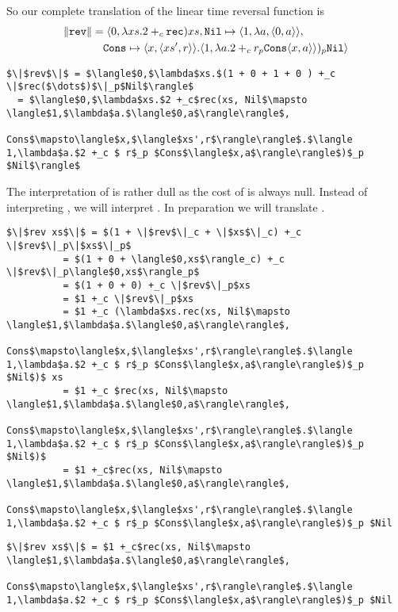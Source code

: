 So our complete translation of the linear time reversal function is
\begin{align*}
  \|\texttt{rev}\| &= \langle 0, \lambda xs.2 +_c \texttt{rec})xs, \texttt{Nil}\mapsto \langle 1, \lambda a, \langle 0, a \rangle\rangle,\\
              &\quad \texttt{Cons}\mapsto \langle x, \langle xs', r\rangle\rangle.\langle 1,\lambda a.2 +_c r_p \texttt{Cons}\langle x, a \rangle\rangle)_p \texttt{Nil} \rangle
\end{align*}
%
\begin{framed}
\begin{small}
\begin{lstlisting}
$\|$rev$\|$ = $\langle$0,$\lambda$xs.$(1 + 0 + 1 + 0 ) +_c \|$rec($\dots$)$\|_p$Nil$\rangle$
  = $\langle$0,$\lambda$xs.$2 +_c$rec(xs, Nil$\mapsto \langle$1,$\lambda$a.$\langle$0,a$\rangle\rangle$,
                  Cons$\mapsto\langle$x,$\langle$xs',r$\rangle\rangle$.$\langle 1,\lambda$a.$2 +_c $ r$_p $Cons$\langle$x,a$\rangle\rangle$)$_p $Nil$\rangle$
\end{lstlisting}
\end{small}
\end{framed}

The interpretation of  is rather dull as the cost of  is always null.
Instead of interpreting , we will interpret .
In preparation we will translate .
\begin{lstlisting}
$\|$rev xs$\|$ = $(1 + \|$rev$\|_c + \|$xs$\|_c) +_c \|$rev$\|_p\|$xs$\|_p$
          = $(1 + 0 + \langle$0,xs$\rangle_c) +_c \|$rev$\|_p\langle$0,xs$\rangle_p$
          = $(1 + 0 + 0) +_c \|$rev$\|_p$xs
          = $1 +_c \|$rev$\|_p$xs
          = $1 +_c (\lambda$xs.rec(xs, Nil$\mapsto \langle$1,$\lambda$a.$\langle$0,a$\rangle\rangle$,
                      Cons$\mapsto\langle$x,$\langle$xs',r$\rangle\rangle$.$\langle 1,\lambda$a.$2 +_c $ r$_p $Cons$\langle$x,a$\rangle\rangle$)$_p $Nil$)$ xs
          = $1 +_c $rec(xs, Nil$\mapsto \langle$1,$\lambda$a.$\langle$0,a$\rangle\rangle$,
                      Cons$\mapsto\langle$x,$\langle$xs',r$\rangle\rangle$.$\langle 1,\lambda$a.$2 +_c $ r$_p $Cons$\langle$x,a$\rangle\rangle$)$_p $Nil$)$
          = $1 +_c$rec(xs, Nil$\mapsto \langle$1,$\lambda$a.$\langle$0,a$\rangle\rangle$,
                  Cons$\mapsto\langle$x,$\langle$xs',r$\rangle\rangle$.$\langle 1,\lambda$a.$2 +_c $ r$_p $Cons$\langle$x,a$\rangle\rangle$)$_p $Nil
\end{lstlisting}
\begin{framed}
\begin{small}
\begin{lstlisting}
$\|$rev xs$\|$ = $1 +_c$rec(xs, Nil$\mapsto \langle$1,$\lambda$a.$\langle$0,a$\rangle\rangle$,
                  Cons$\mapsto\langle$x,$\langle$xs',r$\rangle\rangle$.$\langle 1,\lambda$a.$2 +_c $ r$_p $Cons$\langle$x,a$\rangle\rangle$)$_p $Nil
\end{lstlisting}
\end{small}
\end{framed}

